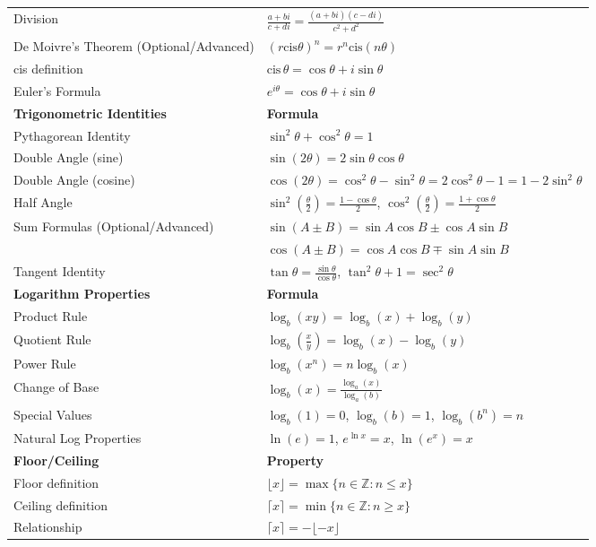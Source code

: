 \documentclass{article}
\begin{document}
\begin{center}
\begin{tabularx}{\textwidth}{|>{\raggedright\arraybackslash}X|>{\raggedright\arraybackslash}X|}
Division & $\frac{a+bi}{c+di} = \frac{(a+bi)(c-di)}{c^2+d^2}$ \\
De Moivre's Theorem (Optional/Advanced) & $(r\text{cis}\theta)^n = r^n\text{cis}(n\theta)$ \\
cis definition & $\text{cis}\,\theta=\cos\theta+i\sin\theta$ \\
Euler's Formula & $e^{i\theta} = \cos\theta + i\sin\theta$ \\
\hline
\textbf{Trigonometric Identities} & \textbf{Formula} \\
\hline
Pythagorean Identity & $\sin^2\theta + \cos^2\theta = 1$ \\
Double Angle (sine) & $\sin(2\theta) = 2\sin\theta\cos\theta$ \\
Double Angle (cosine) & $\cos(2\theta) = \cos^2\theta - \sin^2\theta = 2\cos^2\theta - 1 = 1 - 2\sin^2\theta$ \\
Half Angle & $\sin^2\left(\frac{\theta}{2}\right) = \frac{1-\cos\theta}{2}$, $\cos^2\left(\frac{\theta}{2}\right) = \frac{1+\cos\theta}{2}$ \\
Sum Formulas (Optional/Advanced) & $\sin(A \pm B) = \sin A \cos B \pm \cos A \sin B$ \\
& $\cos(A \pm B) = \cos A \cos B \mp \sin A \sin B$ \\
Tangent Identity & $\tan\theta = \frac{\sin\theta}{\cos\theta}$, $\tan^2\theta + 1 = \sec^2\theta$ \\
\hline
\textbf{Logarithm Properties} & \textbf{Formula} \\
\hline
Product Rule & $\log_b(xy) = \log_b(x) + \log_b(y)$ \\
Quotient Rule & $\log_b\left(\frac{x}{y}\right) = \log_b(x) - \log_b(y)$ \\
Power Rule & $\log_b(x^n) = n\log_b(x)$ \\
Change of Base & $\log_b(x) = \frac{\log_a(x)}{\log_a(b)}$ \\
Special Values & $\log_b(1) = 0$, $\log_b(b) = 1$, $\log_b(b^n) = n$ \\
Natural Log Properties & $\ln(e) = 1$, $e^{\ln x} = x$, $\ln(e^x) = x$ \\
\hline
\textbf{Floor/Ceiling} & \textbf{Property} \\
\hline
Floor definition & $\lfloor x \rfloor = \max\{n \in \mathbb{Z} : n \leq x\}$ \\
Ceiling definition & $\lceil x \rceil = \min\{n \in \mathbb{Z} : n \geq x\}$ \\
Relationship & $\lceil x \rceil = -\lfloor -x \rfloor$ \\

\end{tabularx}
\end{center}
\end{document}
